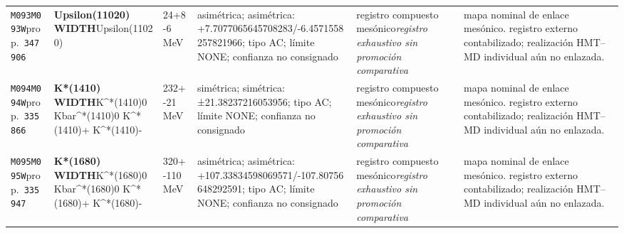\begin{landscape}
\begin{longtable}{L{1.85cm}L{4.45cm}L{2.35cm}L{4.05cm}L{3.35cm}L{7.15cm}}
\texttt{M093}\newline \texttt{M093W}\newline prop.\ \texttt{347906} & \textbf{Upsilon(11020) WIDTH}\newline Upsilon(11020) & 24+8-6\,MeV & asimétrica; asimétrica: +7.7077065645708283/-6.4571558257821966; tipo AC; límite NONE; confianza no consignado & registro compuesto mesónico\newline \emph{registro exhaustivo sin promoción comparativa} & mapa nominal de enlace mesónico. registro externo contabilizado; realización HMT--MD individual aún no enlazada. \\
\texttt{M094}\newline \texttt{M094W}\newline prop.\ \texttt{335866} & \textbf{K*(1410) WIDTH}\newline K\textasciicircum{}*(1410)0 \textbar{}\allowbreak{} Kbar\textasciicircum{}*(1410)0 \textbar{}\allowbreak{} K\textasciicircum{}*(1410)+ \textbar{}\allowbreak{} K\textasciicircum{}*(1410)- & 232+-21\,MeV & simétrica; simétrica: ±21.38237216053956; tipo AC; límite NONE; confianza no consignado & registro compuesto mesónico\newline \emph{registro exhaustivo sin promoción comparativa} & mapa nominal de enlace mesónico. registro externo contabilizado; realización HMT--MD individual aún no enlazada. \\
\texttt{M095}\newline \texttt{M095W}\newline prop.\ \texttt{335947} & \textbf{K*(1680) WIDTH}\newline K\textasciicircum{}*(1680)0 \textbar{}\allowbreak{} Kbar\textasciicircum{}*(1680)0 \textbar{}\allowbreak{} K\textasciicircum{}*(1680)+ \textbar{}\allowbreak{} K\textasciicircum{}*(1680)- & 320+-110\,MeV & asimétrica; asimétrica: +107.33834598069571/-107.80756648292591; tipo AC; límite NONE; confianza no consignado & registro compuesto mesónico\newline \emph{registro exhaustivo sin promoción comparativa} & mapa nominal de enlace mesónico. registro externo contabilizado; realización HMT--MD individual aún no enlazada. \\

\end{longtable}
\end{landscape}
